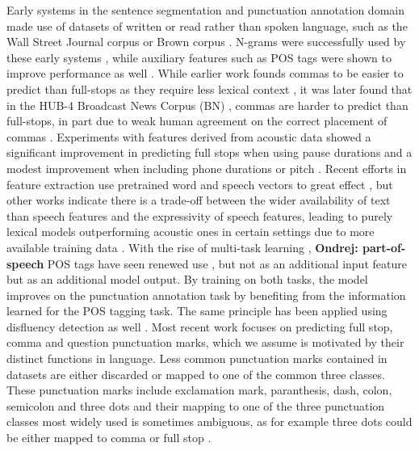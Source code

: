 \documentclass[bsc,deptreport,ai]{infthesis} %
\newcommand{\Ondrej}[1]{{\color{red} \textbf{Ondrej: #1}}}
\begin{document}
Early systems in the sentence segmentation and punctuation annotation domain \citep{palmer1995satz, beeferman1998} made use of datasets of written or read rather than spoken language, such as the Wall Street Journal corpus \citep{wsj} or Brown corpus \citep{browncorpus}. N-grams were successfully used by these early systems \citep{beeferman1998}, while auxiliary features such as POS tags were shown to improve performance as well \citep{palmer1995satz}. While earlier work founds commas to be easier to predict than full-stops as they require less lexical context \citep{beeferman1998}, it was later found that in the HUB-4 Broadcast News Corpus (BN) \citep{hub4}, commas are harder to predict than full-stops, in part due to weak human agreement on the correct placement of commas \citep{christensen2001,batista2008}. Experiments with features derived from acoustic data showed a significant improvement in predicting full stops when using pause durations and a modest improvement when including phone durations or pitch \citep{christensen2001}. Recent efforts in feature extraction use pretrained word and speech vectors to great effect \citep{che2016,zelasko2018,yi2019speech2vec}, but other works indicate there is a trade-off between the wider availability of text than speech features and the expressivity of speech features, leading to purely lexical models outperforming acoustic ones in certain settings due to more available training data \citep{Klejch2017}. With the rise of multi-task learning \citep{crawshaw2020multitask}, \Ondrej{part-of-speech} POS tags have seen renewed use \citep{yi2020adversarial}, but not as an additional input feature but as an additional model output. By training on both tasks, the model improves on the punctuation annotation task by benefiting from the information learned for the POS tagging task. The same principle has been applied using disfluency detection as well \citep{chen2020controllable}. 
Most recent work focuses on predicting full stop, comma and question punctuation marks, which we assume is motivated by their distinct functions in language. Less common punctuation marks contained in datasets are either discarded \citep{zelasko2018} or mapped to one of the common three classes. These punctuation marks include exclamation mark, paranthesis, dash, colon, semicolon and three dots and their mapping to one of the three punctuation classes most widely used is sometimes ambiguous, as for example three dots could be either mapped to comma or full stop \citep{gravano2009}.
\end{document}
